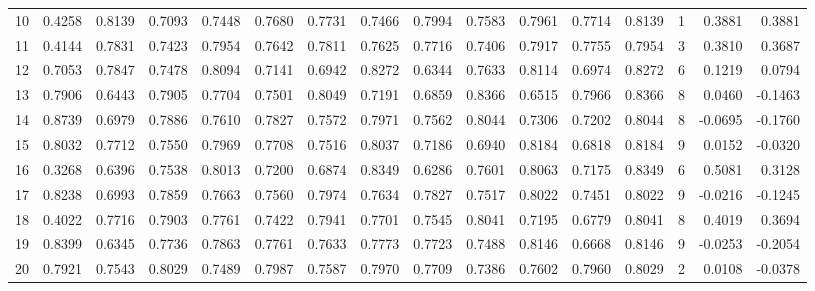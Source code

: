 \begin{tabular}{lrrrrrrrrrrrrrrr}
10  &      0.4258 &  0.8139 &  0.7093 &  0.7448 &  0.7680 &  0.7731 &  0.7466 &  0.7994 &  0.7583 &  0.7961 &   0.7714 &     0.8139 &      1 &                    0.3881 &                     0.3881 \\
11  &      0.4144 &  0.7831 &  0.7423 &  0.7954 &  0.7642 &  0.7811 &  0.7625 &  0.7716 &  0.7406 &  0.7917 &   0.7755 &     0.7954 &      3 &                    0.3810 &                     0.3687 \\
12  &      0.7053 &  0.7847 &  0.7478 &  0.8094 &  0.7141 &  0.6942 &  0.8272 &  0.6344 &  0.7633 &  0.8114 &   0.6974 &     0.8272 &      6 &                    0.1219 &                     0.0794 \\
13  &      0.7906 &  0.6443 &  0.7905 &  0.7704 &  0.7501 &  0.8049 &  0.7191 &  0.6859 &  0.8366 &  0.6515 &   0.7966 &     0.8366 &      8 &                    0.0460 &                    -0.1463 \\
14  &      0.8739 &  0.6979 &  0.7886 &  0.7610 &  0.7827 &  0.7572 &  0.7971 &  0.7562 &  0.8044 &  0.7306 &   0.7202 &     0.8044 &      8 &                   -0.0695 &                    -0.1760 \\
15  &      0.8032 &  0.7712 &  0.7550 &  0.7969 &  0.7708 &  0.7516 &  0.8037 &  0.7186 &  0.6940 &  0.8184 &   0.6818 &     0.8184 &      9 &                    0.0152 &                    -0.0320 \\
16  &      0.3268 &  0.6396 &  0.7538 &  0.8013 &  0.7200 &  0.6874 &  0.8349 &  0.6286 &  0.7601 &  0.8063 &   0.7175 &     0.8349 &      6 &                    0.5081 &                     0.3128 \\
17  &      0.8238 &  0.6993 &  0.7859 &  0.7663 &  0.7560 &  0.7974 &  0.7634 &  0.7827 &  0.7517 &  0.8022 &   0.7451 &     0.8022 &      9 &                   -0.0216 &                    -0.1245 \\
18  &      0.4022 &  0.7716 &  0.7903 &  0.7761 &  0.7422 &  0.7941 &  0.7701 &  0.7545 &  0.8041 &  0.7195 &   0.6779 &     0.8041 &      8 &                    0.4019 &                     0.3694 \\
19  &      0.8399 &  0.6345 &  0.7736 &  0.7863 &  0.7761 &  0.7633 &  0.7773 &  0.7723 &  0.7488 &  0.8146 &   0.6668 &     0.8146 &      9 &                   -0.0253 &                    -0.2054 \\
20  &      0.7921 &  0.7543 &  0.8029 &  0.7489 &  0.7987 &  0.7587 &  0.7970 &  0.7709 &  0.7386 &  0.7602 &   0.7960 &     0.8029 &      2 &                    0.0108 &                    -0.0378 \\

\end{tabular}
